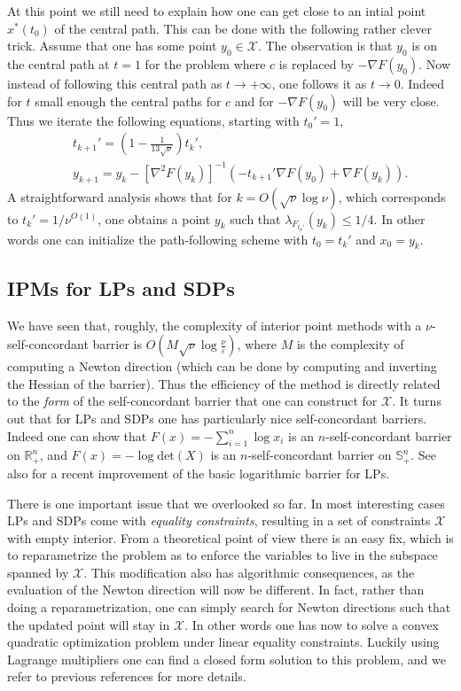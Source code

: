 \documentclass[openany]{now}
\newcommand{\R}{\mathbb{R}}
\newcommand{\cX}{\mathcal{X}}
\renewcommand{\epsilon}{\varepsilon}
\begin{document}
At this point we still need to explain how one can get close to an intial point $x^*(t_0)$ of the central path. This can be done with the following rather clever trick. Assume that one has some point $y_0 \in \cX$. The observation is that $y_0$ is on the central path at $t=1$ for the problem where $c$ is replaced by $- \nabla F(y_0)$. Now instead of following this central path as $t \to +\infty$, one follows it as $t \to 0$. Indeed for $t$ small enough the central paths for $c$ and for $- \nabla F(y_0)$ will be very close. Thus we iterate the following equations, starting with $t_0' = 1$,
\begin{eqnarray*}
& & t_{k+1}' = \left(1 - \frac1{13\sqrt{\nu}}\right) t_k' ,\\
& & y_{k+1} = y_k - [\nabla^2 F(y_k)]^{-1} (- t_{k+1}' \nabla F(y_0) + \nabla F(y_k) ) .
\end{eqnarray*}
A straightforward analysis shows that for $k = O(\sqrt{\nu} \log \nu)$, which corresponds to $t_k'=1/\nu^{O(1)}$, one obtains a point $y_k$ such that $\lambda_{F_{t_k'}}(y_k) \leq 1/4$. In other words one can initialize the path-following scheme with $t_0 = t_k'$ and $x_0 = y_k$.

\subsection{IPMs for LPs and SDPs}
We have seen that, roughly, the complexity of interior point methods with a $\nu$-self-concordant barrier is $O\left(M \sqrt{\nu} \log \frac{\nu}{\epsilon} \right)$, where $M$ is the complexity of computing a Newton direction (which can be done by computing and inverting the Hessian of the barrier). Thus the efficiency of the method is directly related to the {\em form} of the self-concordant barrier that one can construct for $\mathcal{X}$. It turns out that for LPs and SDPs one has particularly nice self-concordant barriers. Indeed one can show that $F(x) = - \sum_{i=1}^n \log x_i$ is an $n$-self-concordant barrier on $\R_{+}^n$, and $F(x) = - \log \mathrm{det}(X)$ is an $n$-self-concordant barrier on $\mathbb{S}_{+}^n$. See also \cite{LS13} for a recent improvement of the basic logarithmic barrier for LPs.

There is one important issue that we overlooked so far. In most interesting cases LPs and SDPs come with {\em equality constraints}, resulting in a set of constraints $\cX$ with empty interior. From a theoretical point of view there is an easy fix, which is to reparametrize the problem as to enforce the variables to live in the subspace spanned by $\cX$. This modification also has algorithmic consequences, as the evaluation of the Newton direction will now be different. In fact, rather than doing a reparametrization, one can simply search for Newton directions such that the updated point will stay in $\cX$. In other words one has now to solve a convex quadratic optimization problem under linear equality constraints. Luckily using Lagrange multipliers one can find a closed form solution to this problem, and we refer to previous references for more details. 
\end{document}
